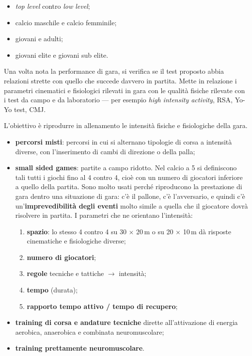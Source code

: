 \begin{itemize}
  \item \textit{top level} contro \textit{low level};
  \item calcio maschile e calcio femminile;
  \item giovani e adulti;
  \item giovani elite e giovani sub elite.
\end{itemize}

Una volta nota la performance di gara, si verifica se il test proposto abbia relazioni strette con
quello che succede davvero in partita. Mette in relazione i parametri cinematici e fisiologici
rilevati in gara con le qualità fisiche rilevate con i test da campo e da laboratorio --- per
esempio \textit{high intensity activity}, RSA, Yo-Yo test, CMJ.

L'obiettivo è riprodurre in allenamento le intensità fisiche e fisiologiche della gara.
\begin{itemize}
  \item \textbf{percorsi misti}: percorsi in cui si alternano tipologie di corsa a intensità
    diverse, con l'inserimento di cambi di direzione o della palla;
  \item \textbf{small sided games}: partite a campo ridotto. Nel calcio a 5 si definiscono tali
    tutti i giochi fino al 4 contro 4, cioè con un numero di giocatori inferiore a quello della
    partita. Sono molto usati perché riproducono la prestazione di gara dentro una situazione di
    gara: c'è il pallone, c'è l'avversario, e quindi c'è un'\textbf{imprevedibilità degli eventi}
    molto simile a quella che il giocatore dovrà risolvere in partita. I parametri che ne orientano
    l'intensità:
    \begin{enumerate}
      \item \textbf{spazio}: lo stesso 4 contro 4 su 30 $\times$ 20\,m o su 20 $\times$ 10\,m dà
        risposte cinematiche e fisiologiche diverse;
      \item \textbf{numero di giocatori};
      \item \textbf{regole} tecniche e tattiche $\rightarrow$ intensità;
      \item \textbf{tempo} (durata);
      \item \textbf{rapporto tempo attivo / tempo di recupero};
    \end{enumerate}
  \item \textbf{training di corsa e andature tecniche} dirette all'attivazione di energia aerobica,
    anaerobica e combinata neuromuscolare;
  \item \textbf{training prettamente neuromuscolare}.
\end{itemize}

